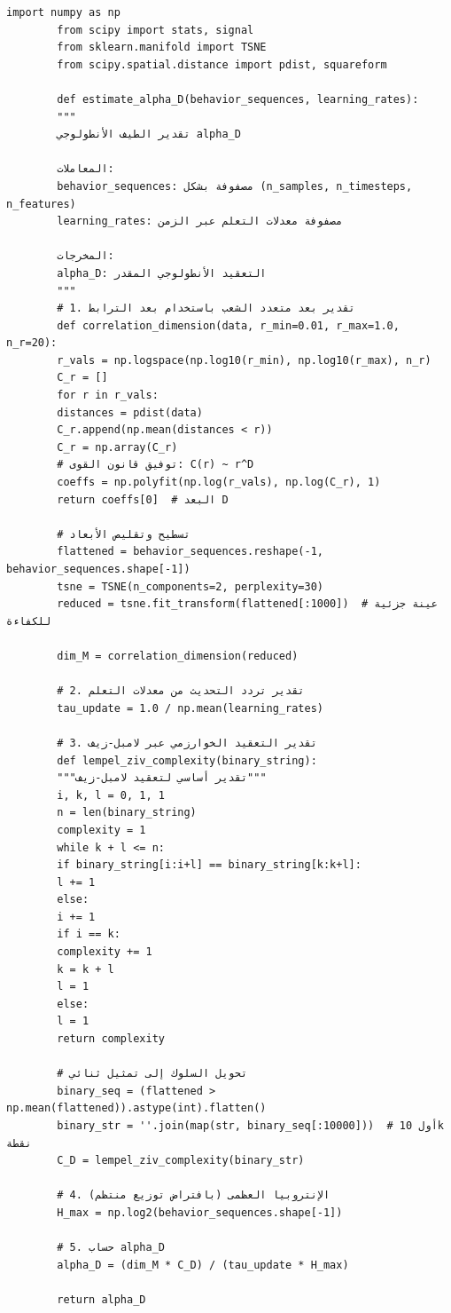 \documentclass[12pt,a4paper]{article}
\begin{document}
	\begin{lstlisting}[caption={شفرة بايثون لتقدير معاملات UCD من بيانات السلاسل الزمنية}, label={lst:ucd-python}]
		import numpy as np
		from scipy import stats, signal
		from sklearn.manifold import TSNE
		from scipy.spatial.distance import pdist, squareform
		
		def estimate_alpha_D(behavior_sequences, learning_rates):
		"""
		تقدير الطيف الأنطولوجي alpha_D
		
		المعاملات:
		behavior_sequences: مصفوفة بشكل (n_samples, n_timesteps, n_features)
		learning_rates: مصفوفة معدلات التعلم عبر الزمن
		
		المخرجات:
		alpha_D: التعقيد الأنطولوجي المقدر
		"""
		# 1. تقدير بعد متعدد الشعب باستخدام بعد الترابط
		def correlation_dimension(data, r_min=0.01, r_max=1.0, n_r=20):
		r_vals = np.logspace(np.log10(r_min), np.log10(r_max), n_r)
		C_r = []
		for r in r_vals:
		distances = pdist(data)
		C_r.append(np.mean(distances < r))
		C_r = np.array(C_r)
		# توفيق قانون القوى: C(r) ~ r^D
		coeffs = np.polyfit(np.log(r_vals), np.log(C_r), 1)
		return coeffs[0]  # البعد D
		
		# تسطيح وتقليص الأبعاد
		flattened = behavior_sequences.reshape(-1, behavior_sequences.shape[-1])
		tsne = TSNE(n_components=2, perplexity=30)
		reduced = tsne.fit_transform(flattened[:1000])  # عينة جزئية للكفاءة
		
		dim_M = correlation_dimension(reduced)
		
		# 2. تقدير تردد التحديث من معدلات التعلم
		tau_update = 1.0 / np.mean(learning_rates)
		
		# 3. تقدير التعقيد الخوارزمي عبر لامبل-زيف
		def lempel_ziv_complexity(binary_string):
		"""تقدير أساسي لتعقيد لامبل-زيف"""
		i, k, l = 0, 1, 1
		n = len(binary_string)
		complexity = 1
		while k + l <= n:
		if binary_string[i:i+l] == binary_string[k:k+l]:
		l += 1
		else:
		i += 1
		if i == k:
		complexity += 1
		k = k + l
		l = 1
		else:
		l = 1
		return complexity
		
		# تحويل السلوك إلى تمثيل ثنائي
		binary_seq = (flattened > np.mean(flattened)).astype(int).flatten()
		binary_str = ''.join(map(str, binary_seq[:10000]))  # أول 10k نقطة
		C_D = lempel_ziv_complexity(binary_str)
		
		# 4. الإنتروبيا العظمى (بافتراض توزيع منتظم)
		H_max = np.log2(behavior_sequences.shape[-1])
		
		# 5. حساب alpha_D
		alpha_D = (dim_M * C_D) / (tau_update * H_max)
		
		return alpha_D
		

\end{lstlisting}
\end{document}
